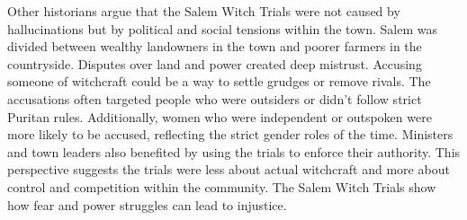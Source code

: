 \documentclass[12pt]{article}
\begin{document}
\vspace{1em}
\begin{tcolorbox}[colframe=black!60, colback=white, 
coltitle=black, colbacktitle=black!15, fonttitle=\bfseries\Large, 
title=Source 3: Political and Social Reasons Behind the Trials, halign title=center, left=10pt, right=10pt, top=10pt, bottom=15pt]
Other historians argue that the Salem Witch Trials were not caused by hallucinations but by political and social tensions within the town. Salem was divided between wealthy landowners in the town and poorer farmers in the countryside. Disputes over land and power created deep mistrust. Accusing someone of witchcraft could be a way to settle grudges or remove rivals. The accusations often targeted people who were outsiders or didn’t follow strict Puritan rules. Additionally, women who were independent or outspoken were more likely to be accused, reflecting the strict gender roles of the time. Ministers and town leaders also benefited by using the trials to enforce their authority. This perspective suggests the trials were less about actual witchcraft and more about control and competition within the community. The Salem Witch Trials show how fear and power struggles can lead to injustice. 
 
\end{tcolorbox}
\end{document}
